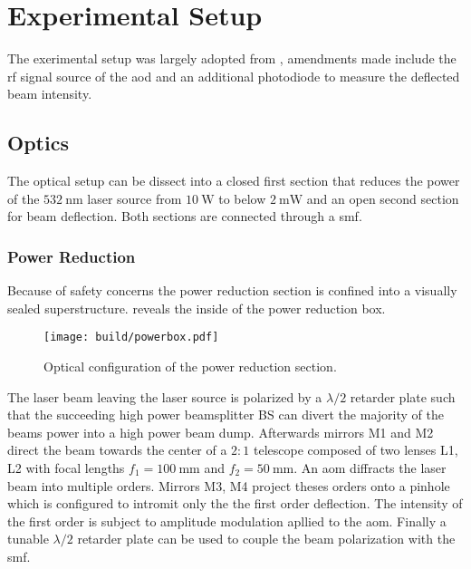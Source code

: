 \chapter{Experimental Setup}

The exerimental setup was largely adopted from \cite{Hertlein2017}, amendments
made include the \gls{rf} signal source of the \gls{aod} and an additional
photodiode to measure the deflected beam intensity.

\section{Optics}

The optical setup can be dissect into a closed first section that reduces
the power of the $\SI{532}{\nano\meter}$ laser source from $\SI{10}{\watt}$
to below $\SI{2}{\milli\watt}$ and an open second section for beam deflection.
Both sections are connected through a \gls{smf}.

\subsection{Power Reduction}
\label{sec:powerbox}

Because of safety concerns the power reduction section is confined into a
visually sealed superstructure.  reveals the inside of the
power reduction box.

\begin{figure}[h]
  \centering
  \texttt{[image: build/powerbox.pdf]}
  \caption{Optical configuration of the power reduction section.}
  \label{fig:powerbox}
\end{figure}

The laser beam leaving the laser source is polarized by a $\lambda/2$ retarder
plate such that the succeeding high power beamsplitter BS can divert the
majority of the beams power into a high power beam dump.
Afterwards mirrors M1 and M2 direct the beam towards the center of a $2:1$
telescope composed of two lenses L1, L2 with focal lengths
$f_1=\SI{100}{\milli\meter}$ and $f_2=\SI{50}{\milli\meter}$.
An \gls{aom} diffracts the laser beam into multiple orders. Mirrors M3, M4
project theses orders onto a pinhole which is configured to intromit only the
the first order deflection. The intensity of the first order is subject to
amplitude modulation apllied to the \gls{aom}.
Finally a tunable $\lambda/2$ retarder plate can be used to couple the beam
polarization with the \gls{smf}.

